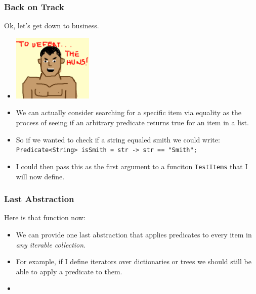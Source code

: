 \documentclass{beamer}
\begin{document}
\begin{frame}
  \frametitle{Back on Track}
  Ok, let's get down to business.
  \begin{itemize}
  \item<2-> \includegraphics[width=0.3\textwidth]{images/business.png}
  \item<3-> We can actually consider searching for a specific item via equality
    as the process of seeing if an arbitrary predicate returns true for an item
    in a list.
  \item<4-> So if we wanted to check if a string equaled smith we could write:
    \texttt{Predicate<String> isSmith = str -> str == "Smith";}
  \item<5-> I could then pass this as the first argument to a funciton \texttt{TestItems}
    that I will now define.
  \end{itemize}
\end{frame}


\begin{frame}
  \frametitle{Last Abstraction}
  Here is that function now:
  \abstractThree
  \begin{itemize}
  \item<2-> We can provide one last abstraction that applies predicates to every item in \emph{any iterable collection}.
  \item<3-> For example, if I define iterators over dictionaries or trees we should still be able to
    apply a predicate to them.
  \item<4-> \abstractFour
  \end{itemize}
\end{frame}
\end{document}
